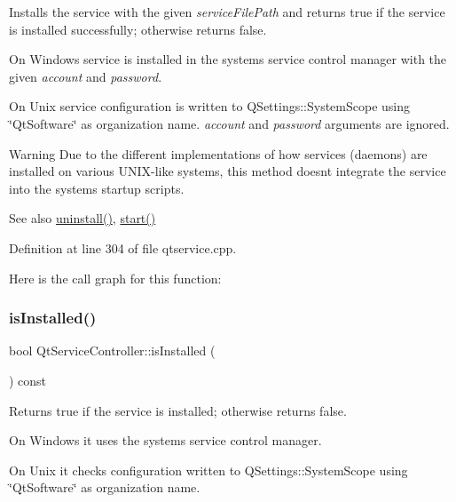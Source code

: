 Installs the service with the given {\itshape service\+File\+Path} and returns true if the service is installed successfully; otherwise returns false.

On Windows service is installed in the system\textquotesingle{}s service control manager with the given {\itshape account} and {\itshape password}.

On Unix service configuration is written to Q\+Settings\+::\+System\+Scope using \char`\"{}\+Qt\+Software\char`\"{} as organization name. {\itshape account} and {\itshape password} arguments are ignored.

\begin{DoxyWarning}{Warning}
Due to the different implementations of how services (daemons) are installed on various U\+N\+I\+X-\/like systems, this method doesn\textquotesingle{}t integrate the service into the system\textquotesingle{}s startup scripts.
\end{DoxyWarning}
\begin{DoxySeeAlso}{See also}
\mbox{\hyperlink{class_qt_service_controller_a25cd2f1f6868ece5de77976eb55cb74c}{uninstall()}}, \mbox{\hyperlink{class_qt_service_controller_a5e9d6da5081d70f31611456d0ef0687e}{start()}} 
\end{DoxySeeAlso}


Definition at line 304 of file qtservice.\+cpp.

Here is the call graph for this function\+:
\mbox{\label{class_qt_service_controller_a7e36fb18a273118709faf22f732feac4}} 
\subsubsection{\texorpdfstring{is\+Installed()}{isInstalled()}}
{\footnotesize\ttfamily bool Qt\+Service\+Controller\+::is\+Installed (\begin{DoxyParamCaption}{ }\end{DoxyParamCaption}) const}

Returns true if the service is installed; otherwise returns false.

On Windows it uses the system\textquotesingle{}s service control manager.

On Unix it checks configuration written to Q\+Settings\+::\+System\+Scope using \char`\"{}\+Qt\+Software\char`\"{} as organization name.

